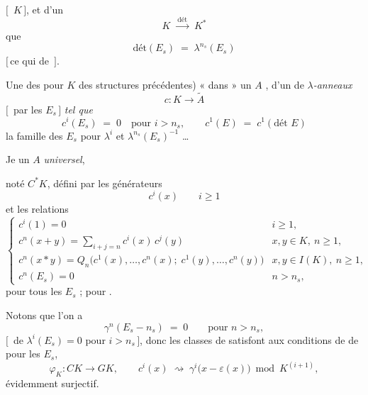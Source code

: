 \documentclass[11pt,a4paper]{article}
\begin{document}
$[\,$ $K\,]$,  et d'un 
\[
  K \;\xrightarrow{\ \text{dét}\ }\; K^{*}
\]
 que
\[
  \text{dét}(E_{s}) \;=\; \lambda^{n_{s}}(E_{s})
\]
$[\,$ce qui  \ill{} \ill{} de 
$\,]$.

Une \struck{\ill{}}  des \emph{}
pour $K$ \ill{} des structures précédentes) « dans » un $A$ \ill{},
 \ill{}  d'un
\emph{\struck{\ill{}}} de
\emph{$\lambda$-anneaux }
\[
  c : K \longrightarrow \widetilde{A}
\]
$[\,$  par \ill{} \ill{} \ill{} les
$E_{s}\,]$ \emph{tel que} \struck{$=$}
\[
  c^{i}(E_{s}) \;=\; 0 \quad \text{pour } i > n_{s} ,
  \qquad
  c^{1}(E) \;=\; c^{1}(\text{dét } E)
\]
\ill{} \ill{} \ill{} \ill{} \ill{}  \ill{} \ill{}
la famille des $E_{s}$ pour $\lambda^{i}$ et $\lambda^{n_{s}}(E_{s})^{-1}$
\ldots

Je \ill{} \ill{} un $A$ \emph{universel},



noté $C^{*}K$, défini par les générateurs
\[
  c^{i}(x) \qquad i \geqslant 1
\]
et les relations
\[
  \begin{cases}
    c^{i}(1) = 0 & i \geqslant 1, \\[3pt]
    c^{n}(x+y) = \displaystyle\sum_{i+j=n} c^{i}(x)\,c^{j}(y)
      & x, y \in K,\ n \geqslant 1, \\[8pt]
    c^{n}(x \ast y) = Q_{n}\bigl(c^{1}(x), \ldots, c^{n}(x);\;
      c^{1}(y), \ldots, c^{n}(y)\bigr)
      & x, y \in I(K),\ n \geqslant 1, \\[5pt]
    c^{n}(E_{s}) = 0 & n > n_{s},
  \end{cases}
\]
pour tous les $E_{s}$ ; pour \ill{} \ill{}  \ill{}.

Notons que l'on a
\[
  \gamma^{n}(E_{s} - n_{s}) \;=\; 0 \qquad \text{pour } n > n_{s} ,
\]
$[\,$\ill{} \ill{} de $\lambda^{i}(E_{s}) = 0$ pour $i > n_{s}\,]$, donc
les classes de  \emph{\ill{}} satisfont aux conditions de
 de  
 pour les $E_{s}$, \ill{} \ill{} \ill{} \ill{}
\[
  \varphi_{K} : CK \longrightarrow GK, \qquad
  c^{i}(x) \;\rightsquigarrow\; \gamma^{i}\bigl(x - \varepsilon(x)\bigr)
  \bmod K^{(i+1)} ,
\]
évidemment surjectif.
\end{document}
